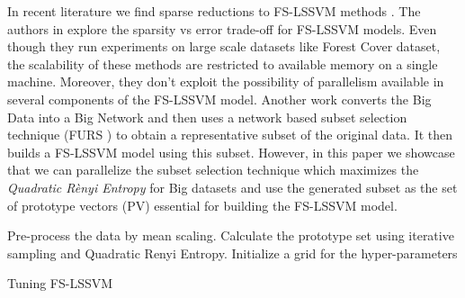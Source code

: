 \documentclass[conference, cmex10]{IEEEtran}
\begin{document}
In recent literature we find sparse reductions to FS-LSSVM methods \cite{Mall2015,Mall2013}. The authors in \cite{Mall2015,Mall2013} explore the sparsity vs error trade-off for FS-LSSVM models. Even though they run experiments on large scale datasets like Forest Cover dataset, the scalability of these methods are restricted to available memory on a single machine. Moreover, they don't exploit the possibility of parallelism available in several components of the FS-LSSVM model. Another work \cite{Mall2014} converts the Big Data into a Big Network and then uses a network based subset selection technique (FURS \cite{Mall2013FURS}) to obtain a representative subset of the original data. It then builds a FS-LSSVM model using this subset. However, in this paper we showcase that we can parallelize the subset selection technique which maximizes the \textit{Quadratic R\`enyi Entropy} for Big datasets and use the generated subset as the set of prototype vectors (PV) essential for building the FS-LSSVM model.


\begin{algorithm} \label{lssvmalgo}
\SetAlgoLined
{}
 Pre-process the data by mean scaling.\;
 Calculate the prototype set using iterative 
 sampling and Quadratic Renyi Entropy.\;
 Initialize a grid for the hyper-parameters\;
 \caption{Tuning FS-LSSVM}
\end{algorithm}


%
%
\end{document}
